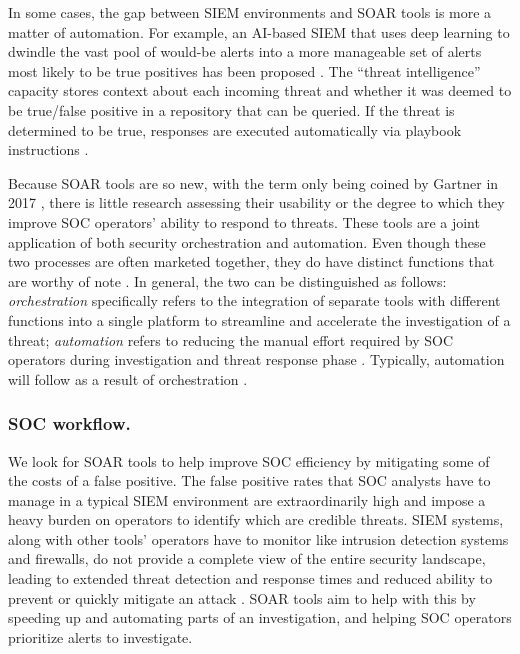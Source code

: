 In some cases, the gap between SIEM environments and SOAR tools is more a matter of automation. For example, an AI-based SIEM that uses deep learning to dwindle the vast pool of would-be alerts into a more manageable set of alerts most likely to be true positives has been proposed \citep{AI_SOAR}. The ``threat intelligence'' capacity stores context about each incoming threat and whether it was deemed to be true/false positive in a repository that can be queried. If the threat is determined to be true, responses are executed automatically via playbook instructions \citep{AI_SOAR}.

Because SOAR tools are so new, with the term only being coined by Gartner in 2017 \citep{BREWER20198}, there is little research assessing their usability or the degree to which they improve SOC operators' ability to respond to threats. These tools are a joint application of both security orchestration and automation. Even though these two processes are often marketed together, they do have distinct functions that are worthy of note \citep{islam_babar_nepal_2019}. In general, the two can be distinguished as follows: \textit{orchestration} specifically refers to the integration of separate tools with different functions into a single platform to streamline and accelerate the investigation of a threat; \textit{automation} refers to reducing the manual effort required by SOC operators during investigation and threat response phase \citep{Microsoft}. Typically, automation will follow as a result of orchestration \citep{islam_babar_nepal_2019}.

\subsubsection{SOC workflow.}
We look for SOAR tools to help improve SOC efficiency by mitigating some of the costs of a false positive. The false positive rates that SOC analysts have to manage in a typical SIEM environment are extraordinarily high and impose a heavy burden on operators to identify which are credible threats. SIEM systems, along with other tools' operators have to monitor like intrusion detection systems and firewalls, do not provide a complete view of the entire security landscape, leading to extended threat detection and response times and reduced ability to prevent or quickly mitigate an attack \citep{Network, islam_babar_nepal_2019}. SOAR tools aim to help with this by speeding up and automating parts of an investigation, and helping SOC operators prioritize alerts to investigate.

